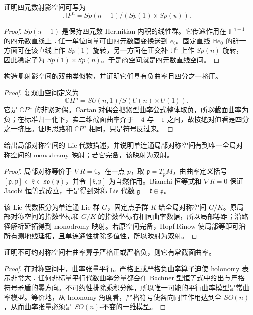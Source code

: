 \documentclass[11pt,a4paper,openany]{ctexbook}
\numberwithin{equation}{chapter}
\begin{document}
\begin{exercise}
证明四元数射影空间可写为
\[
\mathbb HP^n=Sp(n+1)/(Sp(1)\times Sp(n)).
\]
\end{exercise}
\begin{proof}
\(Sp(n+1)\) 是保持四元数 Hermitian 内积的线性群。它传递作用在 \(\mathbb H^{n+1}\) 的四元数直线上：任一单位向量可由四元数酉变换送到 \(e_0\)。固定直线 \(\mathbb H e_0\) 的群一方面可在该直线上作 \(Sp(1)\) 旋转，另一方面在正交补 \(\mathbb H^n\) 上作 \(Sp(n)\) 旋转，因此稳定子为 \(Sp(1)\times Sp(n)\)。于是商空间就是四元数直线空间。
\end{proof}

\begin{exercise}
构造复射影空间的双曲类似物，并证明它们具有负曲率且四分之一挤压。
\end{exercise}
\begin{proof}
复双曲空间定义为
\[
\mathbb CH^n=SU(n,1)/S(U(n)\times U(1)).
\]
它是 \(\mathbb CP^n\) 的非紧对偶。Cartan 对偶会把紧型曲率公式整体取负，所以截面曲率为负；在标准归一化下，实二维截面曲率介于 \(-4\) 与 \(-1\) 之间，故按绝对值看是四分之一挤压。证明思路和 \(\mathbb CP^n\) 相同，只是符号反过来。
\end{proof}

\begin{exercise}
给出局部对称空间的 Lie 代数描述，并说明单连通局部对称空间有到唯一全局对称空间的 monodromy 映射；若它完备，该映射为双射。
\end{exercise}
\begin{proof}
局部对称等价于 \(\nabla R=0\)。在一点 \(p\)，取 \(\mathfrak p=T_pM\)，由曲率定义括号 \([\mathfrak p,\mathfrak p]\subset\mathfrak k\subset\mathfrak{so}(\mathfrak p)\)，并令 \([\mathfrak k,\mathfrak p]\) 为自然作用。Bianchi 恒等式和 \(\nabla R=0\) 保证 Jacobi 恒等式成立，于是得到对称 Lie 代数 \(\mathfrak g=\mathfrak k\oplus\mathfrak p\)。

该 Lie 代数积分为单连通 Lie 群 \(G\)，固定点子群 \(K\) 给全局对称空间 \(G/K\)。原局部对称空间的指数坐标和 \(G/K\) 的指数坐标有相同曲率数据，所以局部等距；沿路径解析延拓得到 monodromy 映射。若原空间完备，Hopf-Rinow 使局部等距可沿所有测地线延拓，且单连通性排除多值性，所以映射为双射。
\end{proof}

\begin{exercise}
证明不可约对称空间若曲率算子严格正或严格负，则它有常截面曲率。
\end{exercise}
\begin{proof}
在对称空间中，曲率张量平行。严格正或严格负曲率算子迫使 holonomy 表示非常大：任何非标量平行代数曲率分量都会在 Bochner 型恒等式中给出与严格符号矛盾的零方向。不可约性排除乘积分解，所以唯一可能的平行曲率模型是常曲率模型。等价地，从 holonomy 角度看，严格符号使各向同性作用达到全 \(SO(n)\)，从而曲率张量必须是 \(SO(n)\)-不变的一维模型。
\end{proof}
\end{document}
